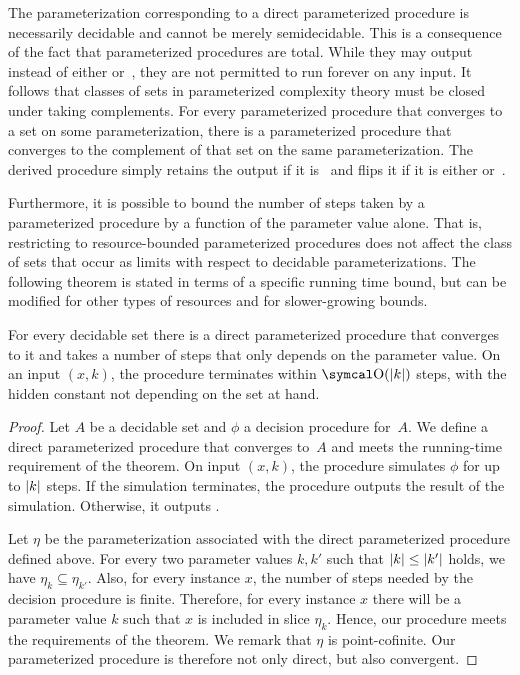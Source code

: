 The parameterization corresponding to a direct parameterized procedure is necessarily decidable and cannot be merely semidecidable.
This is a consequence of the fact that parameterized procedures are total.
While they may output~ instead of either  or~, they are not permitted to run forever on any input.
It follows that classes of sets in parameterized complexity theory must be closed under taking complements.
For every parameterized procedure that converges to a set on some parameterization, there is a parameterized procedure that converges to the complement of that set on the same parameterization.
The derived procedure simply retains the output if it is~ and flips it if it is either  or~.

Furthermore, it is possible to bound the number of steps taken by a parameterized procedure by a function of the parameter value alone.
That is, restricting to resource-bounded parameterized procedures does not affect the class of sets that occur as limits with respect to decidable parameterizations.
The following theorem is stated in terms of a specific running time bound, but can be modified for other types of resources and for slower-growing bounds.

\begin{theorem}
\label{thm:slow_decidable}%
  For every decidable set there is a direct parameterized procedure that converges to it and takes a number of steps that only depends on the parameter value.
  On an input $(x, k)$, the procedure terminates within $\bigO(\length{k})$ steps, with the hidden constant not depending on the set at hand.
\end{theorem}
\begin{proof}
  Let $A$ be a decidable set and $\phi$ a decision procedure for~$A$.
  We define a direct parameterized procedure that converges to~$A$ and meets the running-time requirement of the theorem.
  On input $(x, k)$, the procedure simulates $\phi$ for up to ${\lvert k\rvert}$ steps.
  If the simulation terminates, the procedure outputs the result of the simulation.
  Otherwise, it outputs .

  Let $\eta$ be the parameterization associated with the direct parameterized procedure defined above.
  For every two parameter values $k, k'$ such that ${\lvert k\rvert} \le {\lvert k'\rvert}$ holds, we have $\eta_k \subseteq \eta_{k'}$.
  Also, for every instance $x$, the number of steps needed by the decision procedure is finite.
  Therefore, for every instance $x$ there will be a parameter value $k$ such that $x$ is included in slice $\eta_k$.
  Hence, our procedure meets the requirements of the theorem.
  We remark that $\eta$ is point-cofinite.
  Our parameterized procedure is therefore not only direct, but also convergent.
\end{proof}

